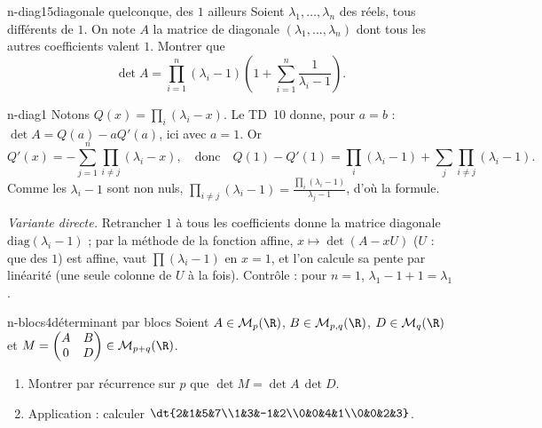 \begin{exo}{n-diag1}{5}{diagonale quelconque, des $1$ ailleurs}
Soient $\lambda_1,\dots,\lambda_n$ des réels, tous différents de $1$. On note $A$ la matrice de diagonale $(\lambda_1,\dots,\lambda_n)$ dont tous les autres coefficients valent $1$. Montrer que
\[\det A=\prod_{i=1}^n(\lambda_i-1)\left(1+\sum_{i=1}^n\frac1{\lambda_i-1}\right).\]
\end{exo}

\begin{corrige}{n-diag1}
Notons $Q(x)=\prod_{i}(\lambda_i-x)$. Le TD~10 donne, pour $a=b$ : $\det A=Q(a)-aQ'(a)$, ici avec $a=1$. Or
\[Q'(x)=-\sum_{j=1}^n\prod_{i\neq j}(\lambda_i-x),\quad\text{donc}\quad Q(1)-Q'(1)=\prod_i(\lambda_i-1)+\sum_j\prod_{i\neq j}(\lambda_i-1).\]
Comme les $\lambda_i-1$ sont non nuls, $\prod_{i\neq j}(\lambda_i-1)=\frac{\prod_i(\lambda_i-1)}{\lambda_j-1}$, d'où la formule.

\emph{Variante directe.} Retrancher $1$ à tous les coefficients donne la matrice diagonale $\mathrm{diag}(\lambda_i-1)$ ; par la méthode de la fonction affine, $x\mapsto\det(A-xU)$ ($U$ : que des $1$) est affine, vaut $\prod(\lambda_i-1)$ en $x=1$, et l'on calcule sa pente par linéarité (une seule colonne de $U$ à la fois).
Contrôle : pour $n=1$, $\lambda_1-1+1=\lambda_1$.
\end{corrige}

\begin{exo}{n-blocs}{4}{déterminant par blocs}
Soient $A\in\mathcal M_p(\R)$, $B\in\mathcal M_{p,q}(\R)$, $D\in\mathcal M_q(\R)$ et $M=\begin{pmatrix}A&B\\0&D\end{pmatrix}\in\mathcal M_{p+q}(\R)$.
\begin{enumerate}
\item Montrer par récurrence sur $p$ que $\det M=\det A\,\det D$.
\item Application : calculer $\dt{2&1&5&7\\1&3&-1&2\\0&0&4&1\\0&0&2&3}$.
\end{enumerate}
\end{exo}

